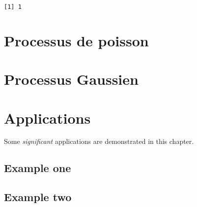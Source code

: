 \documentclass[
]{book}
\theoremstyle{definition}
\theoremstyle{definition}
\theoremstyle{definition}
\theoremstyle{remark}
\begin{document}
\begin{verbatim}
[1] 1
\end{verbatim}

\hypertarget{processus-de-poisson}{%
\chapter{Processus de poisson}\label{processus-de-poisson}}

\hypertarget{processus-gaussien}{%
\chapter{Processus Gaussien}\label{processus-gaussien}}

\hypertarget{applications}{%
\chapter{Applications}\label{applications}}

Some \emph{significant} applications are demonstrated in this chapter.

\hypertarget{example-one}{%
\section{Example one}\label{example-one}}

\hypertarget{example-two}{%
\section{Example two}\label{example-two}}

  
\end{document}

